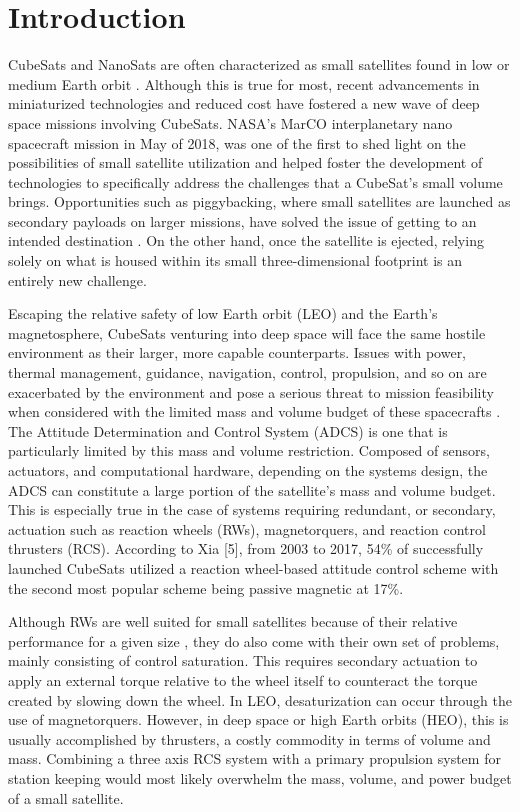 \documentclass[conf]{new-aiaa}
\begin{document}
\section{Introduction}
CubeSats and NanoSats are often characterized as small satellites found in low or medium Earth orbit \cite{1}. Although this is true for most, recent advancements in miniaturized technologies and reduced cost have fostered a new wave of deep space missions involving CubeSats. NASA’s MarCO interplanetary nano spacecraft mission in May of 2018, was one of the first to shed light on the possibilities of small satellite utilization and helped foster the development of technologies to specifically address the challenges that a CubeSat’s small volume brings. Opportunities such as piggybacking, where small satellites are launched as secondary payloads on larger missions, have solved the issue of getting to an intended destination \cite{2}. On the other hand, once the satellite is ejected, relying solely on what is housed within its small three-dimensional footprint is an entirely new challenge.

Escaping the relative safety of low Earth orbit (LEO) and the Earth’s magnetosphere, CubeSats venturing into deep space will face the same hostile environment as their larger, more capable counterparts. Issues with power, thermal management, guidance, navigation, control, propulsion, and so on are exacerbated by the environment and pose a serious threat to mission feasibility when considered with the limited mass and volume budget of these spacecrafts \cite{3,4}. The Attitude Determination and Control System (ADCS) is one that is particularly limited by this mass and volume restriction. Composed of sensors, actuators, and computational hardware, depending on the systems design, the ADCS can constitute a large portion of the satellite's mass and volume budget. This is especially true in the case of systems requiring redundant, or secondary, actuation such as reaction wheels (RWs), magnetorquers, and reaction control thrusters (RCS). According to Xia [5], from 2003 to 2017, 54\% of successfully launched CubeSats utilized a reaction wheel-based attitude control scheme with the second most popular scheme being passive magnetic at 17\%. 

Although RWs are well suited for small satellites because of their relative performance for a given size \cite{5}, they do also come with their own set of problems, mainly consisting of control saturation. This requires secondary actuation to apply an external torque relative to the wheel itself to counteract the torque created by slowing down the wheel. In LEO, desaturization can occur through the use of magnetorquers. However, in deep space or high Earth orbits (HEO), this is usually accomplished by thrusters, a costly commodity in terms of volume and mass. Combining a three axis RCS system with a primary propulsion system for station keeping would most likely overwhelm the mass, volume, and power budget of a small satellite.
\end{document}
